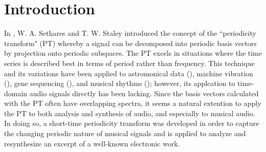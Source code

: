 \chapter{Introduction}

In \cite{sethares1999periodicity}, W. A. Sethares and T. W. Staley introduced the concept of the ``periodicity transform" (PT) whereby a signal can be decomposed into periodic basis vectors by projection onto periodic subspaces. The PT excels in situations where the time series is described best in terms of period rather than frequency. This technique and its variations have been applied to astromonical data (\cite{buccheri1985time}), machine vibration (\cite{muresan2003orthogonal}), gene sequencing (\cite{arora2007detection}), and musical rhythms (\cite{sethares2001meter}); however, its applcation to time-domain audio signals directly has been lacking. Since the basis vectors calculated with the PT often have overlapping spectra, it seems a natural extention to apply the PT to both analysis and synthesis of audio, and especially to musical audio. In doing so, a short-time periodicity transform was developed in order to capture the changing periodic nature of musical signals and is applied to analyze and resynthesize an excerpt of a well-known electronic work.

